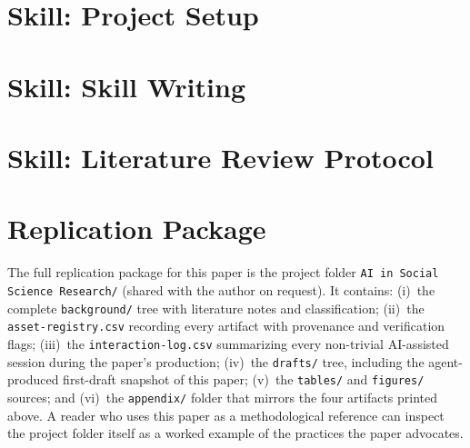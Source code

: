 \documentclass[11pt]{article}
\begin{document}
\section{Skill: Project Setup}
\label{sec:app-project-setup}


\section{Skill: Skill Writing}
\label{sec:app-skill-writing}


\section{Skill: Literature Review Protocol}
\label{sec:app-lit-review}


\section{Replication Package}
\label{sec:app-repro}

The full replication package for this paper is the project folder \texttt{AI in Social Science Research/} (shared with the author on request). It contains: (i)~the complete \texttt{background/} tree with literature notes and classification; (ii)~the \texttt{asset-registry.csv} recording every artifact with provenance and verification flags; (iii)~the \texttt{interaction-log.csv} summarizing every non-trivial AI-assisted session during the paper's production; (iv)~the \texttt{drafts/} tree, including the agent-produced first-draft snapshot of this paper; (v)~the \texttt{tables/} and \texttt{figures/} sources; and (vi)~the \texttt{appendix/} folder that mirrors the four artifacts printed above. A reader who uses this paper as a methodological reference can inspect the project folder itself as a worked example of the practices the paper advocates.
\end{document}
